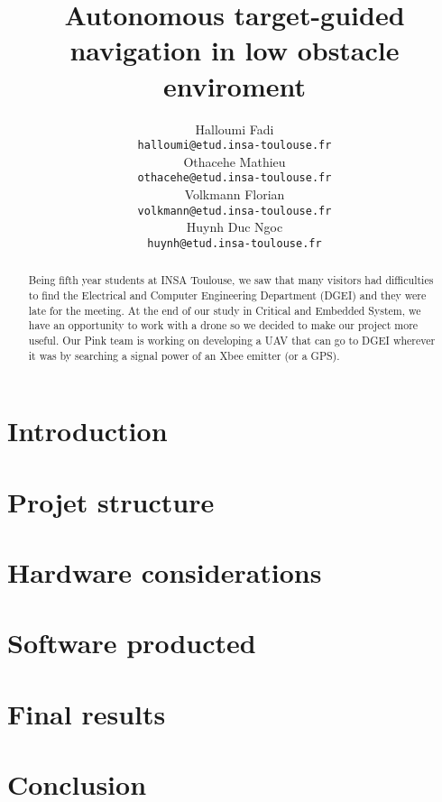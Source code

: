 \documentclass[10pt,a4paper,titlepage]{report}
\author{Halloumi Fadi\\\texttt{halloumi@etud.insa-toulouse.fr}\\
Othacehe Mathieu\\\texttt{othacehe@etud.insa-toulouse.fr}\\
Volkmann Florian\\\texttt{volkmann@etud.insa-toulouse.fr}\\
Huynh Duc Ngoc\\\texttt{huynh@etud.insa-toulouse.fr}}
\title{Autonomous target-guided navigation in low obstacle enviroment}
\begin{document}
\maketitle %
\begin{abstract} %
Being fifth year students at INSA Toulouse, we saw that many visitors had difficulties to find the Electrical and Computer Engineering Department (DGEI) and they were late for the meeting. At the end of our study in Critical and Embedded System, we have an opportunity to work with a drone so we decided to make our project more useful. Our Pink team is working on developing a UAV that can go to DGEI wherever it was by searching a signal power of an Xbee emitter (or a GPS).
\end{abstract}

\tableofcontents %
\clearpage


\chapter{Introduction}

\chapter{Projet structure}

\chapter{Hardware considerations}

\chapter{Software producted}

\chapter{Final results}


\chapter{Conclusion}
\end{document}
